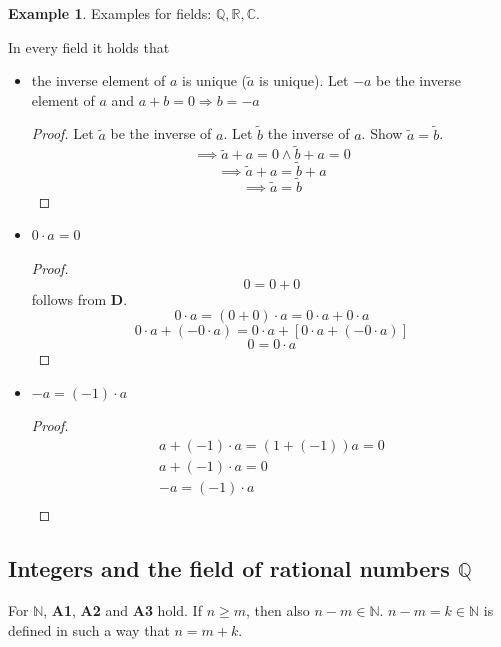 \documentclass[a4paper,landscape,twocolumn]{article}
\theoremstyle{definition}
\newtheorem{ex}{Example}
\begin{document}
\begin{ex}
  Examples for fields: $\mathbb{Q}, \mathbb{R}, \mathbb{C}$.

  In every field it holds that
  \begin{itemize}
    \item the inverse element of $a$ is unique ($\tilde a$ is unique).
      Let $-a$ be the inverse element of $a$ and $a + b = 0 \Rightarrow b = -a$
      \begin{proof}
        Let $\tilde a$ be the inverse of $a$. Let $\tilde b$ the inverse of $a$.
        Show $\tilde a = \tilde b$.
        \[ \implies \tilde a + a = 0 \land \tilde b + a = 0 \]
        \[ \implies \tilde a + a = \tilde b + a \]
        \[ \implies \tilde a = \tilde b \]
      \end{proof}
    \item $0 \cdot a = 0$
      \begin{proof}
        \[ 0 = 0 + 0 \]
        follows from \textbf{D}.
        \[ 0 \cdot a = (0 + 0) \cdot a = 0 \cdot a + 0 \cdot a \]
        \[ 0 \cdot a + (-0 \cdot a) = 0 \cdot a + \left[0 \cdot a + (-0 \cdot a)\right] \]
        \[ 0 = 0 \cdot a \]
      \end{proof}
    \item $-a = (-1) \cdot a$
      \begin{proof}
        \begin{align*}
          a + (-1) \cdot a = (1 + (-1)) a = 0 \\
          a + (-1) \cdot a = 0 \\
          -a = (-1) \cdot a \\
        \end{align*}
      \end{proof}
  \end{itemize}
\end{ex}

\subsection{Integers and the field of rational numbers $\mathbb{Q}$}
%
For $\mathbb{N}$, \textbf{A1}, \textbf{A2} and \textbf{A3} hold.
If $n \geq m$, then also $n - m \in \mathbb{N}$.
$n-m = k \in \mathbb{N}$ is defined in such a way that $n = m + k$.
\end{document}
